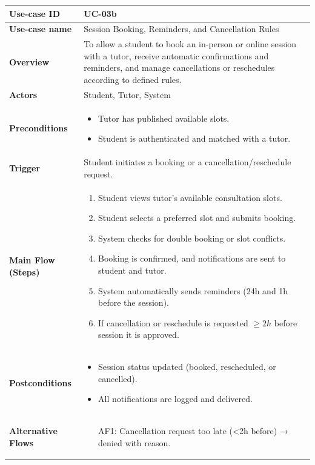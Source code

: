 \begin{table}[H]
\centering
\renewcommand{\arraystretch}{1.3}
\begin{tabular}{|p{3cm}|p{11cm}|}
\hline
\textbf{Use-case ID} & UC-03b \\
\hline
\textbf{Use-case name} & Session Booking, Reminders, and Cancellation Rules \\
\hline
\textbf{Overview} & To allow a student to book an in-person or online session with a tutor, receive automatic confirmations and reminders, and manage cancellations or reschedules according to defined rules. \\
\hline
\textbf{Actors} & Student, Tutor, System \\
\hline
\textbf{Preconditions} &
\begin{itemize}
    \item Tutor has published available slots.
    \item Student is authenticated and matched with a tutor.
\end{itemize} \\
\hline
\textbf{Trigger} & Student initiates a booking or a cancellation/reschedule request. \\
\hline
\textbf{Main Flow (Steps)} &
\begin{enumerate}
    \item Student views tutor’s available consultation slots.
    \item Student selects a preferred slot and submits booking.
    \item System checks for double booking or slot conflicts.
    \item Booking is confirmed, and notifications are sent to student and tutor.
    \item System automatically sends reminders (24h and 1h before the session).
    \item If cancellation or reschedule is requested \(\geq 2h\) before session it is approved.
\end{enumerate} \\
\hline
\textbf{Postconditions} &
\begin{itemize}
    \item Session status updated (booked, rescheduled, or cancelled).
    \item All notifications are logged and delivered.
\end{itemize} \\
\hline
\textbf{Alternative Flows} &
\begin{itemize}
    \item[AF1:] Cancellation request too late (<2h before) → denied with reason.

\end{itemize}
\end{tabular}
\end{table}
